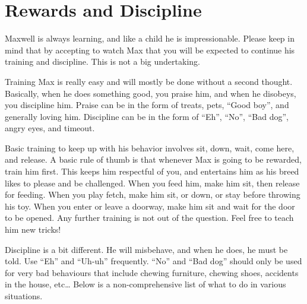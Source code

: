 \documentclass[pdftex,12pt]{article}
\begin{document}
\newpage
\section{Rewards and Discipline}

Maxwell is always learning, and like a child he is impressionable.
Please keep in mind that by accepting to watch Max that you will be expected to continue his training and discipline.
This is not a big undertaking.

\bigskip

Training Max is really easy and will mostly be done without a second thought.
Basically, when he does something good, you praise him,
and when he disobeys, you discipline him.
Praise can be in the form of treats, pets, ``Good boy'', and generally loving him.
Discipline can be in the form of ``Eh'', ``No'', ``Bad dog'', angry eyes, and timeout.

\bigskip

Basic training to keep up with his behavior involves sit, down, wait, come here, and release.
A basic rule of thumb is that whenever Max is going to be rewarded, train him first.
This keeps him respectful of you, and entertains him as his breed likes to please and be challenged.
When you feed him, make him sit, then release for feeding.
When you play fetch, make him sit, or down, or stay before throwing his toy.
When you enter or leave a doorway, make him sit and wait for the door to be opened.
Any further training is not out of the question.
Feel free to teach him new tricks!

\bigskip

Discipline is a bit different.
He will misbehave, and when he does, he must be told.
Use ``Eh'' and ``Uh-uh'' frequently.
``No'' and ``Bad dog'' should only be used for very bad behaviours that include chewing furniture, chewing shoes, accidents in the house, etc\ldots
Below is a non-comprehensive list of what to do in various situations.

\bigskip
\end{document}
